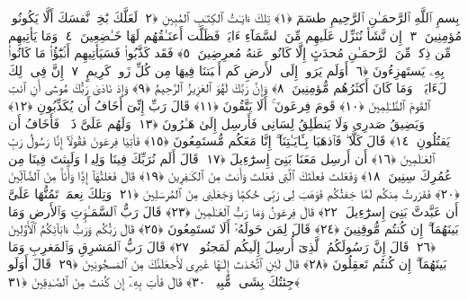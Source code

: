 
  
    
  
    
    

\nopagebreak
  بِسمِ ٱللَّهِ ٱلرَّحمَـٰنِ ٱلرَّحِيمِ
  طسٓمٓ ﴿١﴾
 تِلكَ ءَايَـٰتُ ٱلكِتَـٰبِ ٱلمُبِينِ ﴿٢﴾
 لَعَلَّكَ بَٰخِعٌۭ نَّفسَكَ أَلَّا يَكُونُوا۟ مُؤمِنِينَ ﴿٣﴾
 إِن نَّشَأ نُنَزِّل عَلَيهِم مِّنَ ٱلسَّمَآءِ ءَايَةًۭ فَظَلَّت أَعنَـٰقُهُم لَهَا خَـٰضِعِينَ ﴿٤﴾
 وَمَا يَأتِيهِم مِّن ذِكرٍۢ مِّنَ ٱلرَّحمَـٰنِ مُحدَثٍ إِلَّا كَانُوا۟ عَنهُ مُعرِضِينَ ﴿٥﴾
 فَقَد كَذَّبُوا۟ فَسَيَأتِيهِم أَنۢبَٰٓؤُا۟ مَا كَانُوا۟ بِهِۦ يَستَهزِءُونَ ﴿٦﴾
 أَوَلَم يَرَوا۟ إِلَى ٱلأَرضِ كَم أَنۢبَتنَا فِيهَا مِن كُلِّ زَوجٍۢ كَرِيمٍ ﴿٧﴾
 إِنَّ فِى ذَٟلِكَ لَءَايَةًۭ ۖ وَمَا كَانَ أَكثَرُهُم مُّؤمِنِينَ ﴿٨﴾
 وَإِنَّ رَبَّكَ لَهُوَ ٱلعَزِيزُ ٱلرَّحِيمُ ﴿٩﴾
 وَإِذ نَادَىٰ رَبُّكَ مُوسَىٰٓ أَنِ ٱئتِ ٱلقَومَ ٱلظَّـٰلِمِينَ ﴿١٠﴾
 قَومَ فِرعَونَ ۚ أَلَا يَتَّقُونَ ﴿١١﴾
 قَالَ رَبِّ إِنِّىٓ أَخَافُ أَن يُكَذِّبُونِ ﴿١٢﴾
 وَيَضِيقُ صَدرِى وَلَا يَنطَلِقُ لِسَانِى فَأَرسِل إِلَىٰ هَـٰرُونَ ﴿١٣﴾
 وَلَهُم عَلَىَّ ذَنۢبٌۭ فَأَخَافُ أَن يَقتُلُونِ ﴿١٤﴾
 قَالَ كَلَّا ۖ فَٱذهَبَا بِـَٔايَـٰتِنَآ ۖ إِنَّا مَعَكُم مُّستَمِعُونَ ﴿١٥﴾
 فَأتِيَا فِرعَونَ فَقُولَآ إِنَّا رَسُولُ رَبِّ ٱلعَـٰلَمِينَ ﴿١٦﴾
 أَن أَرسِل مَعَنَا بَنِىٓ إِسرَٰٓءِيلَ ﴿١٧﴾
 قَالَ أَلَم نُرَبِّكَ فِينَا وَلِيدًۭا وَلَبِثتَ فِينَا مِن عُمُرِكَ سِنِينَ ﴿١٨﴾
 وَفَعَلتَ فَعلَتَكَ ٱلَّتِى فَعَلتَ وَأَنتَ مِنَ ٱلكَـٰفِرِينَ ﴿١٩﴾
 قَالَ فَعَلتُهَآ إِذًۭا وَأَنَا۠ مِنَ ٱلضَّآلِّينَ ﴿٢٠﴾
 فَفَرَرتُ مِنكُم لَمَّا خِفتُكُم فَوَهَبَ لِى رَبِّى حُكمًۭا وَجَعَلَنِى مِنَ ٱلمُرسَلِينَ ﴿٢١﴾
 وَتِلكَ نِعمَةٌۭ تَمُنُّهَا عَلَىَّ أَن عَبَّدتَّ بَنِىٓ إِسرَٰٓءِيلَ ﴿٢٢﴾
 قَالَ فِرعَونُ وَمَا رَبُّ ٱلعَـٰلَمِينَ ﴿٢٣﴾
 قَالَ رَبُّ ٱلسَّمَـٰوَٟتِ وَٱلأَرضِ وَمَا بَينَهُمَآ ۖ إِن كُنتُم مُّوقِنِينَ ﴿٢٤﴾
 قَالَ لِمَن حَولَهُۥٓ أَلَا تَستَمِعُونَ ﴿٢٥﴾
 قَالَ رَبُّكُم وَرَبُّ ءَابَآئِكُمُ ٱلأَوَّلِينَ ﴿٢٦﴾
 قَالَ إِنَّ رَسُولَكُمُ ٱلَّذِىٓ أُرسِلَ إِلَيكُم لَمَجنُونٌۭ ﴿٢٧﴾
 قَالَ رَبُّ ٱلمَشرِقِ وَٱلمَغرِبِ وَمَا بَينَهُمَآ ۖ إِن كُنتُم تَعقِلُونَ ﴿٢٨﴾
 قَالَ لَئِنِ ٱتَّخَذتَ إِلَـٰهًا غَيرِى لَأَجعَلَنَّكَ مِنَ ٱلمَسجُونِينَ ﴿٢٩﴾
 قَالَ أَوَلَو جِئتُكَ بِشَىءٍۢ مُّبِينٍۢ ﴿٣٠﴾
 قَالَ فَأتِ بِهِۦٓ إِن كُنتَ مِنَ ٱلصَّـٰدِقِينَ ﴿٣١﴾
